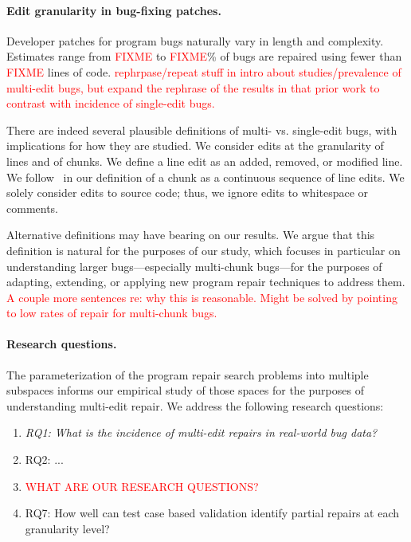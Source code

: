 \documentclass[sigconf, timestamp-false, anonymous=true]{acmart}
\newcommand\todo[1]{\textcolor{red}{#1}}
\begin{document}
\paragraph{Edit granularity in bug-fixing patches.}  Developer patches for
program bugs naturally vary in length and complexity.  Estimates range from
\todo{FIXME} to \todo{FIXME}\% of bugs are repaired using fewer than
\todo{FIXME} lines of code.  \todo{rephrpase/repeat stuff in intro about
  studies/prevalence of multi-edit bugs, but expand the rephrase of the results
  in that prior work to contrast with incidence of single-edit bugs.}  

There are indeed several plausible definitions of multi- vs. single-edit bugs,
with implications for how they are studied.  We consider edits at the granularity 
of lines and of chunks. We define a line edit as an added, removed, or modified 
line. We follow~\cite{d4j-dissection} in our definition of a chunk as a continuous 
sequence of line edits. We solely consider edits to source code; thus, we ignore 
edits to whitespace or comments.

Alternative definitions may have bearing on our results.  We argue that this
definition is natural for the purposes of our study, which focuses in particular
on understanding larger bugs---especially multi-chunk bugs---for the purposes of 
adapting, extending, or applying new program repair techniques to address them. 
\todo{A couple more sentences re: why this is reasonable. Might be solved by 
pointing to low rates of repair for multi-chunk bugs.}

\paragraph{Research questions.}  The parameterization of the program repair
search problems into multiple subspaces informs our empirical study of those
spaces for the purposes of understanding multi-edit repair.  We address the
following research questions:

\begin{enumerate}
\item \emph{RQ1: What is the incidence of multi-edit repairs in real-world bug data?}
\item RQ2: ...
\item \todo{WHAT ARE OUR RESEARCH QUESTIONS?}
\item RQ7: How well can test case based validation identify partial repairs at each granularity level?
\end{enumerate}
\end{document}
